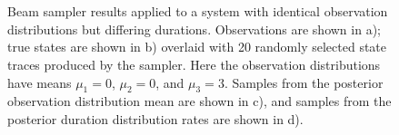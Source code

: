 
\begin{figure}
     \\
     \\
    \caption{Beam sampler results applied to a system with identical observation distributions but differing durations. Observations are shown in a); true states are shown in b) overlaid with 20 randomly selected state traces produced by the sampler. Here the observation distributions have means $\mu_1 = 0$, $\mu_2 = 0$, and $\mu_3 = 3$. Samples from the posterior observation distribution mean are shown in c), and samples from the posterior duration distribution rates are shown in d).}
    \label{fig:experiment2_results}
\end{figure}
